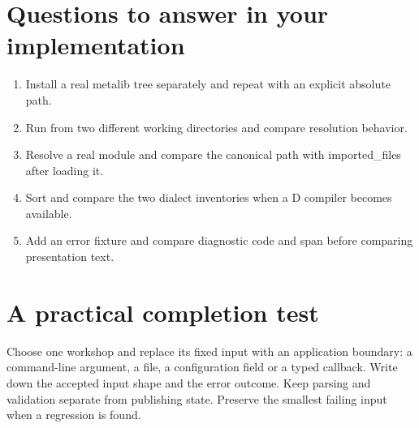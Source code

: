 \section*{Questions to answer in your implementation}
\begin{enumerate}
\item Install a real metalib tree separately and repeat with an explicit absolute path.
\item Run from two different working directories and compare resolution behavior.
\item Resolve a real module and compare the canonical path with imported\_files after loading it.
\item Sort and compare the two dialect inventories when a D compiler becomes available.
\item Add an error fixture and compare diagnostic code and span before comparing presentation text.
\end{enumerate}
\section*{A practical completion test}
Choose one workshop and replace its fixed input with an application boundary: a command-line argument, a file, a configuration field or a typed callback. Write down the accepted input shape and the error outcome. Keep parsing and validation separate from publishing state. Preserve the smallest failing input when a regression is found.

